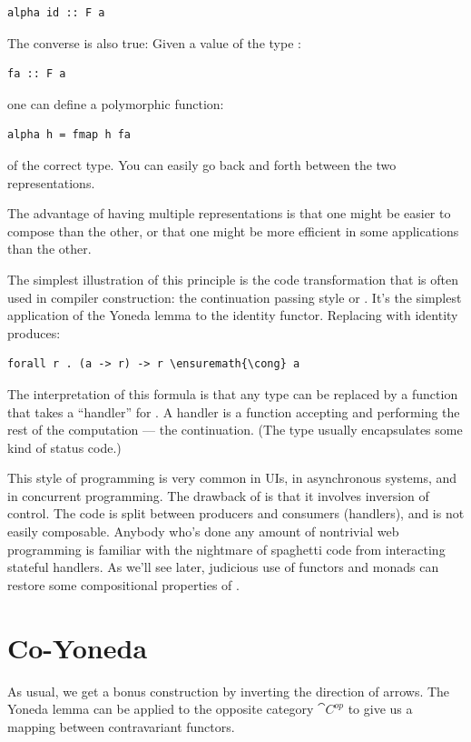 \begin{Verbatim}
alpha id :: F a
\end{Verbatim}
The converse is also true: Given a value of the type :

\begin{Verbatim}
fa :: F a
\end{Verbatim}
one can define a polymorphic function:

\begin{Verbatim}
alpha h = fmap h fa
\end{Verbatim}
of the correct type. You can easily go back and forth between the two
representations.

The advantage of having multiple representations is that one might be
easier to compose than the other, or that one might be more efficient in
some applications than the other.

The simplest illustration of this principle is the code transformation
that is often used in compiler construction: the continuation passing
style or . It's the simplest application of the Yoneda lemma to the
identity functor. Replacing  with identity produces:

\begin{Verbatim}[commandchars=\\\{\}]
forall r . (a -> r) -> r \ensuremath{\cong} a
\end{Verbatim}
The interpretation of this formula is that any type  can be
replaced by a function that takes a ``handler'' for . A
handler is a function accepting  and performing the rest of
the computation --- the continuation. (The type  usually
encapsulates some kind of status code.)

This style of programming is very common in UIs, in asynchronous
systems, and in concurrent programming. The drawback of  is that it
involves inversion of control. The code is split between producers and
consumers (handlers), and is not easily composable. Anybody who's done
any amount of nontrivial web programming is familiar with the nightmare
of spaghetti code from interacting stateful handlers. As we'll see
later, judicious use of functors and monads can restore some
compositional properties of .

\section{Co-Yoneda}

As usual, we get a bonus construction by inverting the direction of
arrows. The Yoneda lemma can be applied to the opposite category
$\cat{C}^{op}$ to give us a mapping between contravariant
functors.

